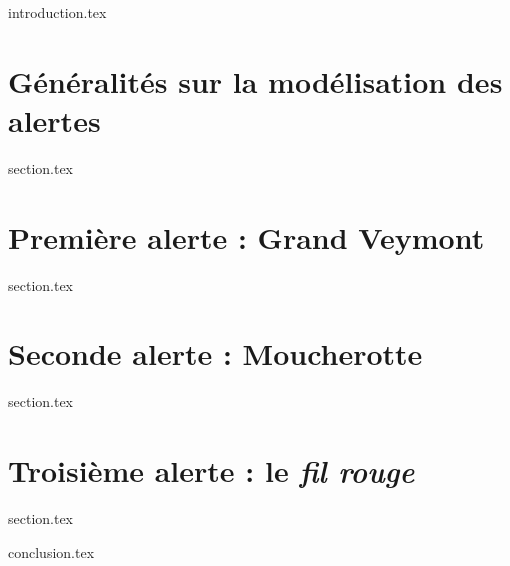 
\chaptertoc{}

{introduction.tex}

\section{Généralités sur la modélisation des alertes}
\label{sec:9-1}
{section.tex}

\section{Première alerte : Grand Veymont}
\label{sec:9-2}
{section.tex}

\section{Seconde alerte : Moucherotte}
\label{sec:9-3}
{section.tex}

\section{Troisième alerte : le \emph{fil rouge}}
\label{sec:9-4}
{section.tex}

{conclusion.tex}

